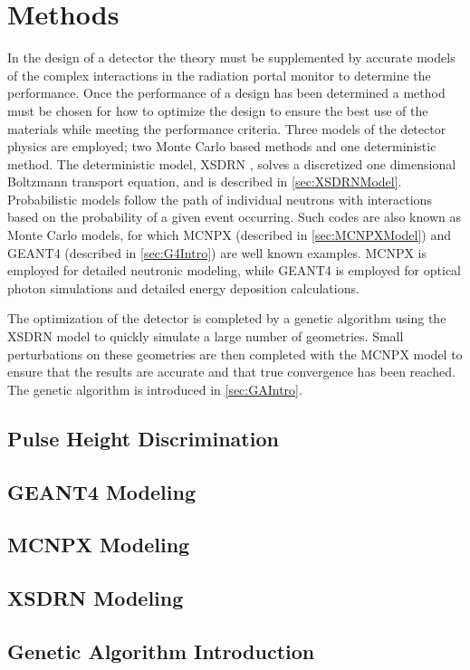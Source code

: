 \chapter{Methods}
\label{chap:methods}
In the design of a detector the theory must be supplemented by accurate models of the complex interactions in the radiation portal monitor to determine the performance.
Once the performance of a design has been determined a method must be chosen for how to optimize the design to  ensure the best use of the materials while meeting the performance criteria.
Three models of the detector physics are employed; two Monte Carlo based methods and one deterministic method.
The deterministic model, XSDRN \cite{XSDRNPM_2011}, solves a discretized one dimensional Boltzmann transport equation, and is described in \autoref{sec:XSDRNModel}.
Probabilistic models follow the path of individual neutrons with interactions based on the probability of a given event occurring.
Such codes are also known as Monte Carlo models, for which MCNPX (described in \autoref{sec:MCNPXModel}) and GEANT4 (described in \autoref{sec:G4Intro}) are well known examples.
MCNPX is employed for detailed neutronic modeling, while GEANT4 is employed for optical photon simulations and detailed energy deposition calculations.

The optimization of the detector is completed by a genetic algorithm using the XSDRN model to quickly simulate a large number of geometries.
Small perturbations on these geometries are then completed with the MCNPX model to ensure that the results are accurate and that true convergence has been reached.
The genetic algorithm is introduced in \autoref{sec:GAIntro}.

\section{Pulse Height Discrimination}
\label{sec:PulseHeightDiscrm}


\section{GEANT4 Modeling}
\label{sec:G4Intro}


\section{MCNPX Modeling}
\label{sec:MCNPXModel}


\section{XSDRN Modeling}
\label{sec:XSDRNModel}


\section{Genetic Algorithm Introduction}
\label{sec:GAIntro}

